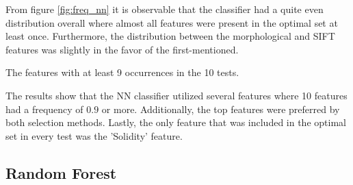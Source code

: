 \documentclass{kththesis}
\begin{document}
\newpage

From figure \ref{fig:freq_nn} it is observable that the classifier had a quite even distribution overall where almost all features were present in the optimal set at least once. Furthermore, the distribution between the morphological and SIFT features was slightly in the favor of the first-mentioned.  


\begin{table}[h!]
  \begin{center}
    \caption{The features with at least 9 occurrences in the 10 tests.}
  \end{center}
  \label{nn_features}
\end{table}

The results show that the NN classifier utilized several features where 10 features had a frequency of $0.9$ or more. Additionally, the top features were preferred by both selection methods. Lastly, the only feature that was included in the optimal set in every test was the 'Solidity' feature.

\newpage

\subsection{Random Forest}
\end{document}
